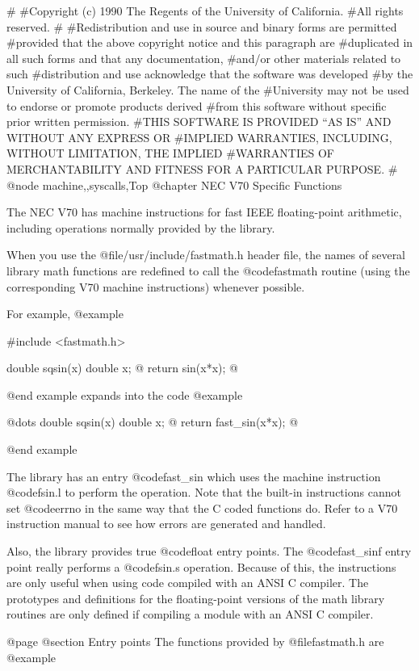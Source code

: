 #
#Copyright (c) 1990 The Regents of the University of California.
#All rights reserved.
#
#Redistribution and use in source and binary forms are permitted
#provided that the above copyright notice and this paragraph are
#duplicated in all such forms and that any documentation,
#and/or other materials related to such
#distribution and use acknowledge that the software was developed
#by the University of California, Berkeley.  The name of the
#University may not be used to endorse or promote products derived
#from this software without specific prior written permission.
#THIS SOFTWARE IS PROVIDED ``AS IS'' AND WITHOUT ANY EXPRESS OR
#IMPLIED WARRANTIES, INCLUDING, WITHOUT LIMITATION, THE IMPLIED
#WARRANTIES OF MERCHANTABILITY AND FITNESS FOR A PARTICULAR PURPOSE.
#
@node machine,,syscalls,Top
@chapter NEC V70 Specific Functions

The NEC V70 has machine instructions for fast IEEE floating-point
arithmetic, including operations normally provided by the library.

When you use the @file{/usr/include/fastmath.h} header file, the
names of several library math functions are redefined to call the
@code{fastmath} routine (using the corresponding V70 machine instructions)
whenever possible.

For example,
@example

#include <fastmath.h>

double sqsin(x)
double x;
@{
  return sin(x*x);
@}

@end example
expands into the code
@example

@dots{}
double sqsin(x)
double x;
@{
  return fast_sin(x*x);
@}

@end example

The library has an entry @code{fast_sin} which uses the machine
instruction @code{fsin.l} to perform the operation.  Note that the
built-in instructions cannot set @code{errno}
in the same way that the C coded functions do.  Refer to a V70
instruction manual to see how errors are generated and handled.

Also, the library provides true @code{float} entry points.  The
@code{fast_sinf} entry point really performs a @code{fsin.s}
operation.  Because of this, the instructions are only useful when
using code compiled with an ANSI C compiler.  The prototypes
and definitions for the floating-point versions of the math library
routines are only defined if compiling a module with an ANSI C
compiler.

@page
@section Entry points
The functions provided by @file{fastmath.h} are
@example

